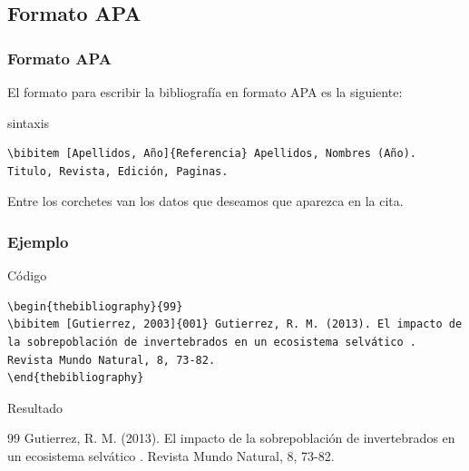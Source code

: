 \documentclass[aspectratio=1610]{beamer}%
\begin{document}
\subsection{Formato APA}
\begin{frame}[fragile]
\frametitle{\textbf{Formato APA}}
\justifying
 El formato para escribir la bibliografía en formato APA es la siguiente:
\begin{block}{sintaxis}
   \lstset{language=}%
   \vspace{-0.8cm}
\begin{lstlisting}
\bibitem [Apellidos, Año]{Referencia} Apellidos, Nombres (Año). Titulo, Revista, Edición, Paginas.
\end{lstlisting}\vspace{-0.3cm}

\end{block}
Entre los corchetes van los datos que deseamos que aparezca en la cita.
\end{frame}

\begin{frame}[fragile]
\frametitle{\textbf{Ejemplo}}
\justifying
 \begin{exampleblock}{Código}
   \vspace{-0.8cm}
\begin{lstlisting}
\begin{thebibliography}{99}
\bibitem [Gutierrez, 2003]{001} Gutierrez, R. M. (2013). El impacto de la sobrepoblación de invertebrados en un ecosistema selvático . Revista Mundo Natural, 8, 73-82.
\end{thebibliography}  
\end{lstlisting}\vspace{-0.3cm}
\end{exampleblock}

\begin{block}{Resultado}
\begin{thebibliography}{99}
 Gutierrez, R. M. (2013). El impacto de la sobrepoblación de invertebrados en un ecosistema selvático . Revista Mundo Natural, 8, 73-82.
\end{thebibliography}
\end{block}


\end{frame}
\end{document}
